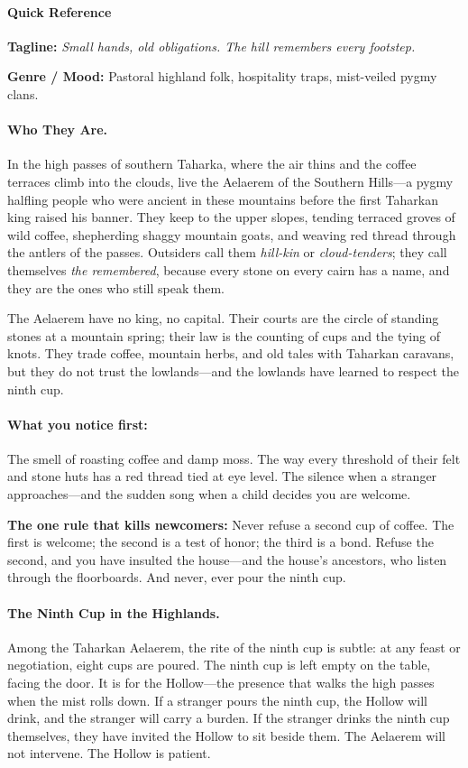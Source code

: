 \paragraph{Quick Reference}
\textbf{Tagline:} \textit{Small hands, old obligations. The hill remembers every footstep.}

\textbf{Genre / Mood:} Pastoral highland folk, hospitality traps, mist-veiled pygmy clans.

\paragraph{Who They Are.} In the high passes of southern Taharka, where the air thins and the coffee terraces climb into the clouds, live the Aelaerem of the Southern Hills---a pygmy halfling people who were ancient in these mountains before the first Taharkan king raised his banner. They keep to the upper slopes, tending terraced groves of wild coffee, shepherding shaggy mountain goats, and weaving red thread through the antlers of the passes. Outsiders call them \textit{hill-kin} or \textit{cloud-tenders}; they call themselves \textit{the remembered}, because every stone on every cairn has a name, and they are the ones who still speak them.

The Aelaerem have no king, no capital. Their courts are the circle of standing stones at a mountain spring; their law is the counting of cups and the tying of knots. They trade coffee, mountain herbs, and old tales with Taharkan caravans, but they do not trust the lowlands---and the lowlands have learned to respect the ninth cup.

\paragraph{What you notice first:} The smell of roasting coffee and damp moss. The way every threshold of their felt and stone huts has a red thread tied at eye level. The silence when a stranger approaches---and the sudden song when a child decides you are welcome.

\textbf{The one rule that kills newcomers:} Never refuse a second cup of coffee. The first is welcome; the second is a test of honor; the third is a bond. Refuse the second, and you have insulted the house---and the house's ancestors, who listen through the floorboards. And never, ever pour the ninth cup.

\paragraph{The Ninth Cup in the Highlands.} Among the Taharkan Aelaerem, the rite of the ninth cup is subtle: at any feast or negotiation, eight cups are poured. The ninth cup is left empty on the table, facing the door. It is for the Hollow---the presence that walks the high passes when the mist rolls down. If a stranger pours the ninth cup, the Hollow will drink, and the stranger will carry a burden. If the stranger drinks the ninth cup themselves, they have invited the Hollow to sit beside them. The Aelaerem will not intervene. The Hollow is patient.

